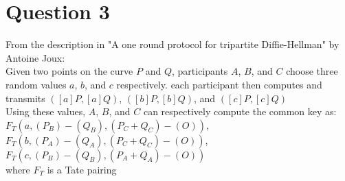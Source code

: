 \documentclass[10pt]{article}
\begin{document}
\section*{Question 3}
From the description in "A one round protocol for tripartite Diffie-Hellman" by Antoine Joux: \\
Given two points on the curve $P$ and $Q$, participants $A$, $B$, and $C$ choose three random values $a$, $b$, and $c$ respectively. each participant then computes and transmits $([a]P, [a]Q)$, $([b]P, [b]Q)$, and $([c]P, [c]Q)$\\ 
Using these values, $A$, $B$, and $C$ can respectively compute the common key as: \\
$F_T(a, (P_B)-(Q_B), (P_C + Q_C) - (O))$,\\
$F_T(b, (P_A)-(Q_A), (P_C + Q_C) - (O))$,\\
$F_T(c, (P_B)-(Q_B), (P_A + Q_A) - (O))$ \\
where $F_T$ is a Tate pairing
\end{document}
